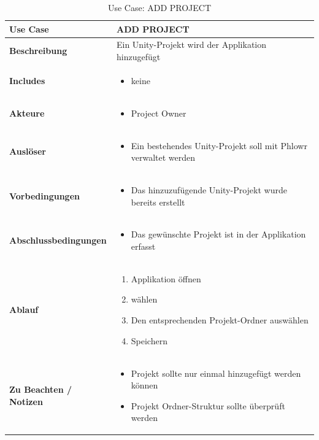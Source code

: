 \begin{table}[H]
    \centering
    \settowidth{}
    \setlength\extrarowheight{2pt}
    \begin{tabulary}{1.0\textwidth}{|m{4cm}|m{10cm}|}
      \hline
      \textbf{Use Case} &
      \textbf{ADD PROJECT}\\
      \hline
      \textbf{Beschreibung} &
      Ein Unity-Projekt wird der Applikation hinzugefügt\\ 
      \hline
      \textbf{Includes} &
      \begin{itemize}
        \item keine 
      \end{itemize}\\ 
      \hline
      \textbf{Akteure} &
      \begin{itemize}
        \item Project Owner
      \end{itemize}\\ 
      \hline
      \textbf{Auslöser} &
      \begin{itemize}
        \item Ein bestehendes Unity-Projekt soll mit Phlowr verwaltet werden
      \end{itemize}\\ 
      \hline
      \textbf{Vorbedingungen} &
      \begin{itemize}
        \item Das hinzuzufügende Unity-Projekt wurde bereits erstellt
      \end{itemize}\\ 
      \hline
      \textbf{Abschlussbedingungen} &
      \begin{itemize}
        \item Das gewünschte Projekt ist in der Applikation erfasst
      \end{itemize}\\ 
      \hline
      \textbf{Ablauf} &
      \begin{enumerate}
        \item Applikation öffnen
        \item <Projekt Hinzufügen> wählen
        \item Den entsprechenden Projekt-Ordner auswählen
        \item Speichern
        \end{enumerate}\\ 
      \hline
      \textbf{Zu Beachten / Notizen} &
      \begin{itemize}
        \item Projekt sollte nur einmal hinzugefügt werden können
        \item Projekt Ordner-Struktur sollte überprüft werden
        \end{itemize}\\ 
      \hline
    \end{tabulary}
    \caption{Use Case: ADD PROJECT}
  \end{table}
